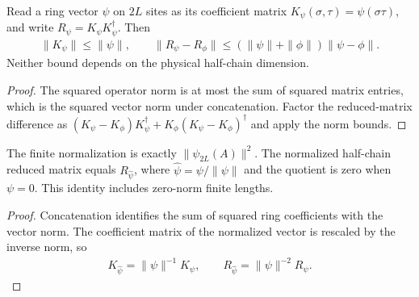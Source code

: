 \begin{lemma}
    \label{lem:half_chain_physical_reduced_stability}
    \leanok
    Read a ring vector $\psi$ on $2L$ sites as its coefficient matrix
    $K_\psi(\sigma,\tau)=\psi(\sigma\tau)$, and write
    $R_\psi=K_\psi K_\psi^\dagger$. Then
    \begin{align}
        \|K_\psi\|\le\|\psi\|,
        \qquad
        \|R_\psi-R_\phi\|
        \le(\|\psi\|+\|\phi\|)\|\psi-\phi\|.
    \end{align}
    Neither bound depends on the physical half-chain dimension.
\end{lemma}
\begin{proof}
    \leanok
    The squared operator norm is at most the sum of squared matrix
    entries, which is the squared vector norm under concatenation.
    Factor the reduced-matrix difference as
    $(K_\psi-K_\phi)K_\psi^\dagger+
        K_\phi(K_\psi-K_\phi)^\dagger$ and apply the norm bounds.
\end{proof}

\begin{lemma}
    \label{lem:half_chain_actual_vector_normalization}
    \leanok
    The finite normalization is exactly $\|\psi_{2L}(A)\|^2$.
    The normalized half-chain reduced matrix equals $R_{\widehat\psi}$,
    where $\widehat\psi=\psi/\|\psi\|$ and the quotient is zero when
    $\psi=0$. This identity includes zero-norm finite lengths.
\end{lemma}
\begin{proof}
    \leanok
    Concatenation identifies the sum of squared ring coefficients with
    the vector norm. The coefficient matrix of the normalized vector is
    rescaled by the inverse norm, so
    \begin{align}
        K_{\widehat\psi}=\|\psi\|^{-1}K_\psi,\qquad
        R_{\widehat\psi}=\|\psi\|^{-2}R_\psi.
        \label{eq:half_chain_normalized_kernel}
    \end{align}
\end{proof}

